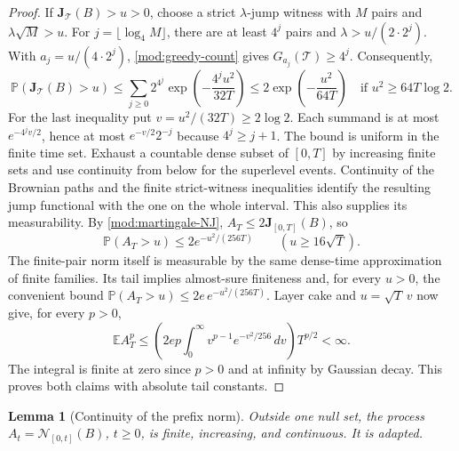 \documentclass[11pt]{article}
\numberwithin{equation}{section}
\newtheorem{lemma}[theorem]{Lemma}
\theoremstyle{remark}
\theoremstyle{definition}
\begin{document}
\begin{proof}
If $\mathbf J_{\mathcal T}(B)>u>0$, choose a strict $\lambda$-jump
witness with $M$ pairs and $\lambda\sqrt M>u$.  For
$j=\lfloor\log_4 M\rfloor$, there are at least $4^j$ pairs and
$\lambda>u/(2\cdot2^j)$.  With $a_j=u/(4\cdot2^j)$,
\eqref{mod:greedy-count} gives $G_{a_j}(\mathcal T)\ge4^j$.
Consequently,
\[
 \mathbb P(\mathbf J_{\mathcal T}(B)>u)
 \le\sum_{j\ge0}2^{4^j}
       \exp\!\left(-\frac{4^ju^2}{32T}\right)
 \le2\exp\!\left(-\frac{u^2}{64T}\right)
 \quad\text{if }u^2\ge64T\log2.
\]
For the last inequality put $v=u^2/(32T)\ge2\log2$.
Each summand is at most $e^{-4^jv/2}$, hence at most
$e^{-v/2}2^{-j}$ because $4^j\ge j+1$.
The bound is uniform in the finite time set.  Exhaust a countable dense
subset of $[0,T]$ by increasing finite sets and use continuity from
below for the superlevel events.  Continuity of the Brownian paths and
the finite strict-witness inequalities identify the resulting jump
functional with the one on the whole interval.  This also supplies its
measurability.  By \eqref{mod:martingale-NJ}, $A_T\le2\mathbf J_{[0,T]}(B)$,
so
\[
 \mathbb P(A_T>u)\le2e^{-u^2/(256T)}
 \qquad(u\ge16\sqrt T).
\]
The finite-pair norm itself is measurable by the same dense-time
approximation of finite families.  Its tail implies almost-sure
finiteness and, for every $u>0$, the convenient bound
$\mathbb P(A_T>u)\le2e\,e^{-u^2/(256T)}$.
Layer cake and $u=\sqrt T\,v$ now give, for every $p>0$,
\[
 \mathbb E A_T^p\le
 \left(2ep\int_0^\infty v^{p-1}e^{-v^2/256}\,dv\right)T^{p/2}<\infty.
\]
The integral is finite at zero since $p>0$ and at infinity by Gaussian
decay.  This proves both claims with absolute tail constants.
\end{proof}

\begin{lemma}[Continuity of the prefix norm]
\label{mod:brownian-prefix}
Outside one null set, the process
$A_t=\mathcal N_{[0,t]}(B)$, $t\ge0$, is finite, increasing, and
continuous. It is adapted.
\end{lemma}
\end{document}
